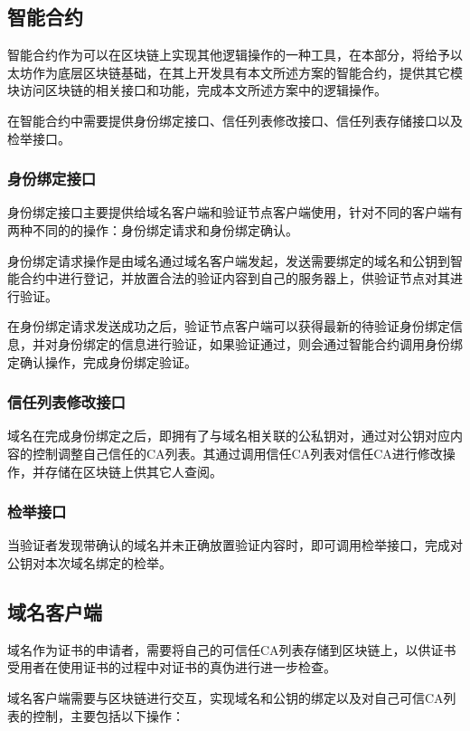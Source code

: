 \subsection{智能合约}

智能合约作为可以在区块链上实现其他逻辑操作的一种工具，在本部分，将给予以太坊作为底层区块链基础，在其上开发具有本文所述方案的智能合约，提供其它模块访问区块链的相关接口和功能，完成本文所述方案中的逻辑操作。

在智能合约中需要提供身份绑定接口、信任列表修改接口、信任列表存储接口以及检举接口。

\subsubsection{身份绑定接口}

身份绑定接口主要提供给域名客户端和验证节点客户端使用，针对不同的客户端有两种不同的的操作：身份绑定请求和身份绑定确认。

身份绑定请求操作是由域名通过域名客户端发起，发送需要绑定的域名和公钥到智能合约中进行登记，并放置合法的验证内容到自己的服务器上，供验证节点对其进行验证。

在身份绑定请求发送成功之后，验证节点客户端可以获得最新的待验证身份绑定信息，并对身份绑定的信息进行验证，如果验证通过，则会通过智能合约调用身份绑定确认操作，完成身份绑定验证。

\subsubsection{信任列表修改接口}

域名在完成身份绑定之后，即拥有了与域名相关联的公私钥对，通过对公钥对应内容的控制调整自己信任的CA列表。其通过调用信任CA列表对信任CA进行修改操作，并存储在区块链上供其它人查阅。


\subsubsection{检举接口}

当验证者发现带确认的域名并未正确放置验证内容时，即可调用检举接口，完成对公钥对本次域名绑定的检举。

\subsection{域名客户端}

域名作为证书的申请者，需要将自己的可信任CA列表存储到区块链上，以供证书受用者在使用证书的过程中对证书的真伪进行进一步检查。

域名客户端需要与区块链进行交互，实现域名和公钥的绑定以及对自己可信CA列表的控制，主要包括以下操作：

